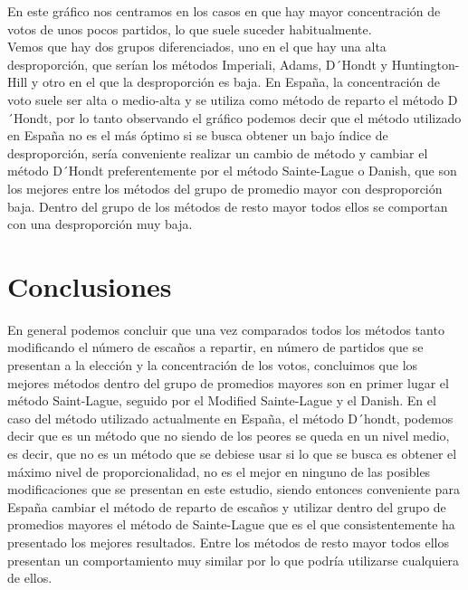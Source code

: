 \documentclass[12pt,a4paper,]{book}
\def\ifprincipal{} %
\numberwithin{dummy}{section}
\theoremstyle{ocrenumbox}
\theoremstyle{blacknumex}
\theoremstyle{blacknumbox}
\theoremstyle{ocrenum}
\theoremstyle{ocrenum}
\begin{document}
En este gráfico nos centramos en los casos en que hay mayor
concentración de votos de unos pocos partidos, lo que suele suceder
habitualmente.\\
Vemos que hay dos grupos diferenciados, uno en el que hay una alta
desproporción, que serían los métodos Imperiali, Adams, D´Hondt y
Huntington-Hill y otro en el que la desproporción es baja. En España, la
concentración de voto suele ser alta o medio-alta y se utiliza como
método de reparto el método D´Hondt, por lo tanto observando el gráfico
podemos decir que el método utilizado en España no es el más óptimo si
se busca obtener un bajo índice de desproporción, sería conveniente
realizar un cambio de método y cambiar el método D´Hondt preferentemente
por el método Sainte-Lague o Danish, que son los mejores entre los
métodos del grupo de promedio mayor con desproporción baja. Dentro del
grupo de los métodos de resto mayor todos ellos se comportan con una
desproporción muy baja.

\hypertarget{conclusiones}{%
\section{Conclusiones}\label{conclusiones}}

En general podemos concluir que una vez comparados todos los métodos
tanto modificando el número de escaños a repartir, en número de partidos
que se presentan a la elección y la concentración de los votos,
concluimos que los mejores métodos dentro del grupo de promedios mayores
son en primer lugar el método Saint-Lague, seguido por el Modified
Sainte-Lague y el Danish. En el caso del método utilizado actualmente en
España, el método D´hondt, podemos decir que es un método que no siendo
de los peores se queda en un nivel medio, es decir, que no es un método
que se debiese usar si lo que se busca es obtener el máximo nivel de
proporcionalidad, no es el mejor en ninguno de las posibles
modificaciones que se presentan en este estudio, siendo entonces
conveniente para España cambiar el método de reparto de escaños y
utilizar dentro del grupo de promedios mayores el método de Sainte-Lague
que es el que consistentemente ha presentado los mejores resultados.
Entre los métodos de resto mayor todos ellos presentan un comportamiento
muy similar por lo que podría utilizarse cualquiera de ellos.

\FloatBarrier

\ifdefined\ifprincipal
\else
\setlength{\parindent}{1em}
\pagestyle{fancy}
\setcounter{tocdepth}{4}
\tableofcontents
\end{document}
